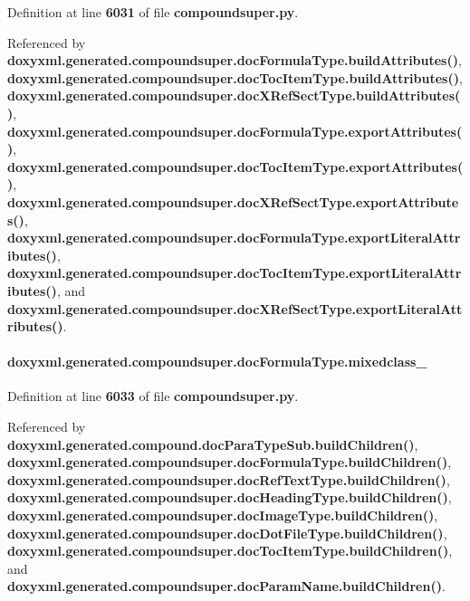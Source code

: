 Definition at line {\bf 6031} of file {\bf compoundsuper.\+py}.



Referenced by {\bf doxyxml.\+generated.\+compoundsuper.\+doc\+Formula\+Type.\+build\+Attributes()}, {\bf doxyxml.\+generated.\+compoundsuper.\+doc\+Toc\+Item\+Type.\+build\+Attributes()}, {\bf doxyxml.\+generated.\+compoundsuper.\+doc\+X\+Ref\+Sect\+Type.\+build\+Attributes()}, {\bf doxyxml.\+generated.\+compoundsuper.\+doc\+Formula\+Type.\+export\+Attributes()}, {\bf doxyxml.\+generated.\+compoundsuper.\+doc\+Toc\+Item\+Type.\+export\+Attributes()}, {\bf doxyxml.\+generated.\+compoundsuper.\+doc\+X\+Ref\+Sect\+Type.\+export\+Attributes()}, {\bf doxyxml.\+generated.\+compoundsuper.\+doc\+Formula\+Type.\+export\+Literal\+Attributes()}, {\bf doxyxml.\+generated.\+compoundsuper.\+doc\+Toc\+Item\+Type.\+export\+Literal\+Attributes()}, and {\bf doxyxml.\+generated.\+compoundsuper.\+doc\+X\+Ref\+Sect\+Type.\+export\+Literal\+Attributes()}.

\paragraph[{mixedclass\+\_\+}]{\setlength{\rightskip}{0pt plus 5cm}doxyxml.\+generated.\+compoundsuper.\+doc\+Formula\+Type.\+mixedclass\+\_\+}\label{classdoxyxml_1_1generated_1_1compoundsuper_1_1docFormulaType_acd1cba3b2daade674579c4ac285750a6}


Definition at line {\bf 6033} of file {\bf compoundsuper.\+py}.



Referenced by {\bf doxyxml.\+generated.\+compound.\+doc\+Para\+Type\+Sub.\+build\+Children()}, {\bf doxyxml.\+generated.\+compoundsuper.\+doc\+Formula\+Type.\+build\+Children()}, {\bf doxyxml.\+generated.\+compoundsuper.\+doc\+Ref\+Text\+Type.\+build\+Children()}, {\bf doxyxml.\+generated.\+compoundsuper.\+doc\+Heading\+Type.\+build\+Children()}, {\bf doxyxml.\+generated.\+compoundsuper.\+doc\+Image\+Type.\+build\+Children()}, {\bf doxyxml.\+generated.\+compoundsuper.\+doc\+Dot\+File\+Type.\+build\+Children()}, {\bf doxyxml.\+generated.\+compoundsuper.\+doc\+Toc\+Item\+Type.\+build\+Children()}, and {\bf doxyxml.\+generated.\+compoundsuper.\+doc\+Param\+Name.\+build\+Children()}.

